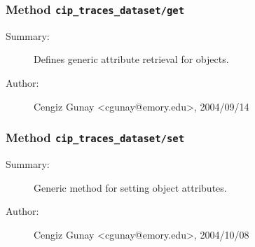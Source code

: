 \subsubsection[Method \texttt{get}]{Method \texttt{cip\_traces\_dataset/get}}%
%
\label{ref_cip_traces_dataset__get}%
\hypertarget{ref_cip_traces_dataset__get}{}%
\begin{description}
\item[Summary:]Defines generic attribute retrieval for objects.
%
%
%
%
%
%
%
\item[Author:]%
Cengiz Gunay <cgunay@emory.edu>, 2004/09/14%
\end{description}
\methodline%
\subsubsection[Method \texttt{set}]{Method \texttt{cip\_traces\_dataset/set}}%
%
\label{ref_cip_traces_dataset__set}%
\hypertarget{ref_cip_traces_dataset__set}{}%
\begin{description}
\item[Summary:]Generic method for setting object attributes.
%
%
%
%
%
%
%
\item[Author:]%
Cengiz Gunay <cgunay@emory.edu>, 2004/10/08%
\end{description}
\methodline%
